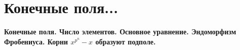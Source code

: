 \section{
	Конечные поля... %
}

\textbf{Конечные поля. Число элементов. Основное уравнение. Эндоморфизм Фробениуса. Корни $x^{p^n} - x$ образуют подполе.}
